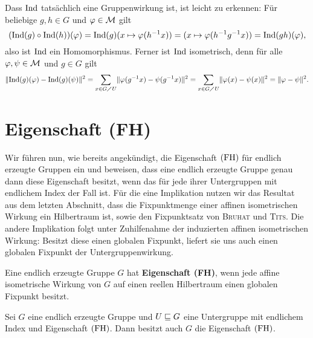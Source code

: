 Dass $\operatorname{Ind}$ tatsächlich eine Gruppenwirkung ist, ist leicht zu erkennen: Für beliebige $g,h \in G$ und $\varphi \in \mathcal{M}$ gilt
\[ 
	(\operatorname{Ind}(g) \circ \operatorname{Ind}(h))(\varphi) = \operatorname{Ind}(g)(x \mapsto \varphi(h^{-1}x))
	= (x \mapsto \varphi(h^{-1}g^{-1}x))
	= \operatorname{Ind}(gh)(\varphi),
\]
also ist $\operatorname{Ind}$ ein Homomorphismus. Ferner ist $\operatorname{Ind}$ isometrisch, denn für alle $\varphi, \psi \in \mathcal{M}$ und $g \in G$ gilt
\[
	\lVert\operatorname{Ind}(g)(\varphi) - \operatorname{Ind}(g)(\psi)\rVert^2 = \sum\limits_{x \in G \diagup U} \lVert\varphi(g^{-1}x) - \psi(g^{-1}x)\rVert^2
	= \sum\limits_{x \in G \diagup U} \lVert\varphi(x) - \psi(x)\rVert^2
	= \lVert\varphi - \psi\rVert^2.
\]

\section{Eigenschaft (FH)}
\label{sec:property_FH}
	Wir führen nun, wie bereits angekündigt, die Eigenschaft $\operatorname{(FH)}$ für endlich erzeugte Gruppen ein und beweisen, dass eine endlich erzeugte Gruppe genau dann diese Eigenschaft besitzt, wenn das für jede ihrer Untergruppen mit endlichem Index der Fall ist. Für die eine Implikation nutzen wir das Resultat aus dem letzten Abschnitt, dass die Fixpunktmenge einer affinen isometrischen Wirkung ein Hilbertraum ist, sowie den Fixpunktsatz von \textsc{Bruhat} und \textsc{Tits}. Die andere Implikation folgt unter Zuhilfenahme der induzierten affinen isometrischen Wirkung: Besitzt diese einen globalen Fixpunkt, liefert sie uns auch einen globalen Fixpunkt der Untergruppenwirkung.

\begin{definition}
	Eine endlich erzeugte Gruppe $G$ hat \textbf{Eigenschaft (FH)}, wenn jede affine isometrische Wirkung von $G$ auf einen reellen Hilbertraum einen globalen Fixpunkt besitzt.
\end{definition}

\begin{satz}
\label{satz:olga_1.2.9}
	Sei $G$ eine endlich erzeugte Gruppe und $U \sqsubseteq G$ eine Untergruppe mit endlichem Index und Eigenschaft $\operatorname{(FH)}$. Dann besitzt auch $G$ die Eigenschaft $\operatorname{(FH)}$.
\end{satz}

